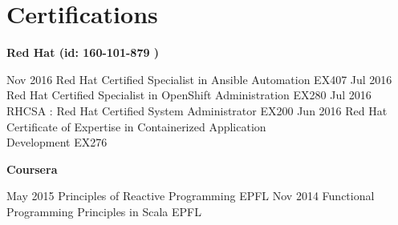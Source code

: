 \documentclass[]{friggeri-cv}
\begin{document}
\section{Certifications}        
    \textbf{\large{Red Hat (id: 160-101-879 )} \vspace{0.2cm}\\}        
	\begin{entrylist}
	
	\setlength{\parsepsave}{\parsep}%
	\setlength{\parsep}{-3pt}%
	
	\entryNoDetail
		{Nov 2016}
		{Red Hat Certified Specialist in Ansible Automation}
	    {EX407}
	    \entryNoDetail
	    {Jul 2016}
	    {Red Hat Certified Specialist in OpenShift Administration}
	    {EX280}
	    \entryNoDetail
	    {Jul 2016}
	    {RHCSA : Red Hat Certified System Administrator }
	    {EX200}   
	    \entryNoDetail
	    {Jun 2016}
	    {Red Hat Certificate of Expertise in Containerized Application \\ Development}
	    {EX276}
	\end{entrylist}    
	\textbf{\large{Coursera} \vspace{0.2cm}\\}    
	\begin{entrylist}
	\entryNoDetail
		{May 2015} 
		{Principles of Reactive Programming }
		{EPFL}
		\entryNoDetail
		{Nov 2014}
		{Functional Programming Principles in Scala}
		{EPFL}
	\end{entrylist}    
\end{document}
